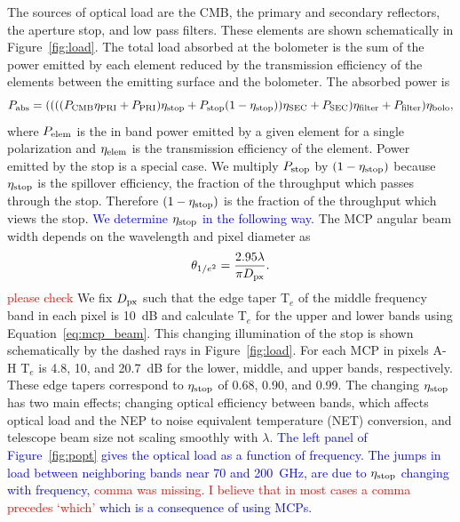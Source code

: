\documentclass[]{spie}  %
\newcommand{\comr}[1]{\textcolor{red}{#1}}
\newcommand{\comb}[1]{\textcolor{blue}{#1}}
\begin{document}
The sources of optical load are the CMB, the primary and secondary reflectors, the aperture stop, and low pass filters.  
These elements are shown schematically in Figure~\ref{fig:load}. 
The total load absorbed at the bolometer is the sum of the power emitted by each element reduced by the transmission 
efficiency of the elements between the emitting surface and the bolometer.  
The absorbed power is
\begin{equation}
\label{eq:load}
P_{\rm abs} =  (((( P_{\rm CMB} \eta_{\rm PRI} + P_{\rm PRI} ) \eta_{\rm stop} + P_{\rm stop}(1-\eta_{\rm stop}) ) \eta_{\rm SEC} + P_{\rm SEC})\eta_{\rm filter} + P_{\rm filter}) \eta_{\rm bolo},
\end{equation} 
where $P_{\rm elem}$ is the in band power emitted by a given element for a single polarization and $\eta_{\rm elem}$ is the 
transmission efficiency 
of the element. Power emitted by the stop is a special case. We multiply $P_{\rm stop}$ by 
$(1-\eta_{\rm stop})$ because $\eta_{\rm stop}$ is the spillover efficiency, the fraction of the throughput which passes through the 
stop. Therefore $(1-\eta_{\rm stop})$ is the fraction of the throughput which views the stop. \comb{We determine 
$\eta_{\rm stop}$ in the following way. }
The MCP angular beam width depends on the wavelength and pixel diameter as\cite{suzuki2013_thesis}
\begin{equation}
\label{eq:mcp_beam}
\theta_{1/e^2} = \frac{2.95 \lambda}{\pi D_{\rm px}}. 
\end{equation} 
\comr{please check} We fix $D_{\rm px}$ such that 
the edge taper T$_e$ of the middle frequency band in each pixel is 10~dB and calculate T$_e$ for the upper and lower bands 
using Equation~\ref{eq:mcp_beam}. This changing illumination of the stop is shown schematically by 
the dashed rays in Figure~\ref{fig:load}. 
For each MCP in pixels A-H T$_e$ is 4.8, 10, and 20.7~dB for the lower, middle, and upper bands, respectively.  These 
edge tapers correspond to $\eta_{\rm stop}$ of 0.68, 0.90, and 0.99.
The changing $\eta_{\rm stop}$ has two main effects; changing optical efficiency between bands, which affects optical load 
and the NEP to noise equivalent temperature (NET) conversion, and telescope beam size not scaling smoothly with $\lambda$.
\comb{The left panel of Figure~\ref{fig:popt} gives the optical load as a function of frequency. The jumps in load between 
neighboring bands near 70 and 200~GHz, are 
due to $\eta_{\rm stop}$ changing with frequency, \comr{comma was missing. I believe that in most cases a comma precedes `which'} 
which is a consequence of using MCPs.  }
\end{document}
